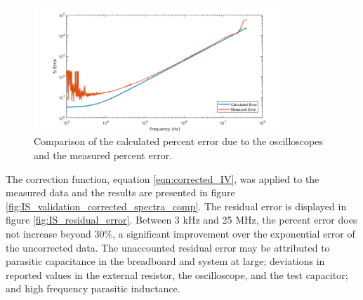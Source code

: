 \begin{figure}[h]
    \centering
    \includegraphics[width=0.85\textwidth]{images/percentError.png}
    \caption{Comparison of the calculated percent error due to the oscilloscopes and the measured percent error.}
    \label{fig:test_circ_measurement_error}
\end{figure}

\par The correction function, equation \ref{eqn:corrected_IV}, was applied to the measured data and the results are presented in figure \ref{fig:IS_validation_corrected_spectra_comp}. The residual error is displayed in figure \ref{fig:IS_residual_error}. Between 3 kHz and 25 MHz, the percent error does not increase beyond 30\%, a significant improvement over the exponential error of the uncorrected data. The unaccounted residual error may be attributed to parasitic capacitance in the breadboard and system at large; deviations in reported values in the external resistor, the oscilloscope, and the test capacitor; and high frequency parasitic inductance.

